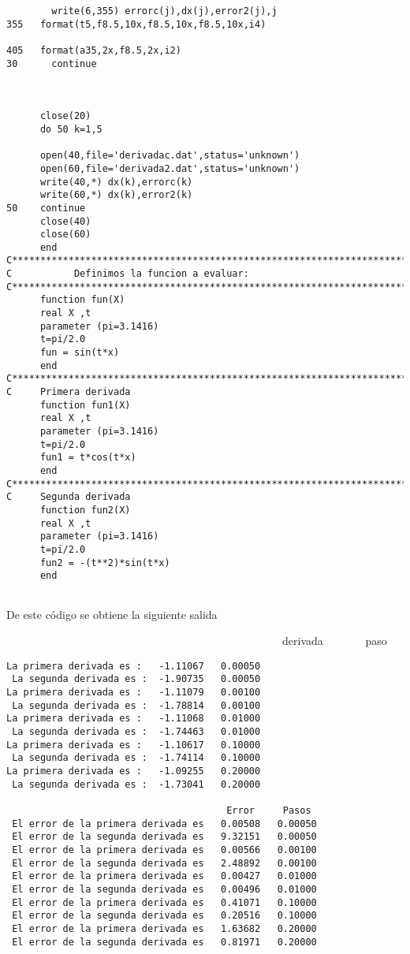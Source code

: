 \documentclass{article}
\begin{document}
\begin{verbatim}
        write(6,355) errorc(j),dx(j),error2(j),j
355   format(t5,f8.5,10x,f8.5,10x,f8.5,10x,i4)
 
405   format(a35,2x,f8.5,2x,i2)
30      continue
 
 
 
      close(20)
      do 50 k=1,5
 
      open(40,file='derivadac.dat',status='unknown')
      open(60,file='derivada2.dat',status='unknown')
      write(40,*) dx(k),errorc(k)
      write(60,*) dx(k),error2(k)
50    continue
      close(40)
      close(60)
      end
C***********************************************************************
C           Definimos la funcion a evaluar:
C***********************************************************************
      function fun(X)
      real X ,t
      parameter (pi=3.1416)
      t=pi/2.0
      fun = sin(t*x)
      end
C***********************************************************************
C     Primera derivada
      function fun1(X)
      real X ,t
      parameter (pi=3.1416)
      t=pi/2.0
      fun1 = t*cos(t*x)
      end
C***********************************************************************
C     Segunda derivada
      function fun2(X)
      real X ,t
      parameter (pi=3.1416)
      t=pi/2.0
      fun2 = -(t**2)*sin(t*x)
      end
 
\end{verbatim}

De este c\'{o}digo se obtiene la siguiente salida

\ \ \ \ \ \ \ \ \ \ \ \ \ \ \ \ \ \ \ \ \ \ \ \ \ \ \ \ \ \ \ \ \ \ \ \ \ \
\ \ \ \ \ \ \ \ \ \ \ \ derivada \ \ \ \ \ \ \ paso
\begin{verbatim}
La primera derivada es :   -1.11067   0.00050
 La segunda derivada es :  -1.90735   0.00050
La primera derivada es :   -1.11079   0.00100
 La segunda derivada es :  -1.78814   0.00100
La primera derivada es :   -1.11068   0.01000
 La segunda derivada es :  -1.74463   0.01000
La primera derivada es :   -1.10617   0.10000
 La segunda derivada es :  -1.74114   0.10000
La primera derivada es :   -1.09255   0.20000
 La segunda derivada es :  -1.73041   0.20000
 
                                       Error     Pasos
 El error de la primera derivada es   0.00508   0.00050
 El error de la segunda derivada es   9.32151   0.00050
 El error de la primera derivada es   0.00566   0.00100
 El error de la segunda derivada es   2.48892   0.00100
 El error de la primera derivada es   0.00427   0.01000
 El error de la segunda derivada es   0.00496   0.01000
 El error de la primera derivada es   0.41071   0.10000
 El error de la segunda derivada es   0.20516   0.10000
 El error de la primera derivada es   1.63682   0.20000
 El error de la segunda derivada es   0.81971   0.20000
 
\end{verbatim}
\end{document}

